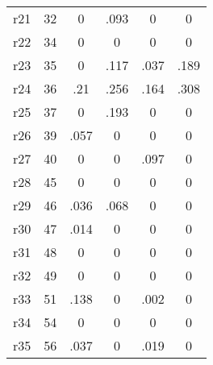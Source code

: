 \begin{table}[htbp]
\begin{tabular}{l*{5}{c}}
r21         &          32&           0&        .093&           0&           0\\
r22         &          34&           0&           0&           0&           0\\
r23         &          35&           0&        .117&        .037&        .189\\
r24         &          36&         .21&        .256&        .164&        .308\\
r25         &          37&           0&        .193&           0&           0\\
r26         &          39&        .057&           0&           0&           0\\
r27         &          40&           0&           0&        .097&           0\\
r28         &          45&           0&           0&           0&           0\\
r29         &          46&        .036&        .068&           0&           0\\
r30         &          47&        .014&           0&           0&           0\\
r31         &          48&           0&           0&           0&           0\\
r32         &          49&           0&           0&           0&           0\\
r33         &          51&        .138&           0&        .002&           0\\
r34         &          54&           0&           0&           0&           0\\
r35         &          56&        .037&           0&        .019&           0\\
\bottomrule
\end{tabular}
\end{table}
